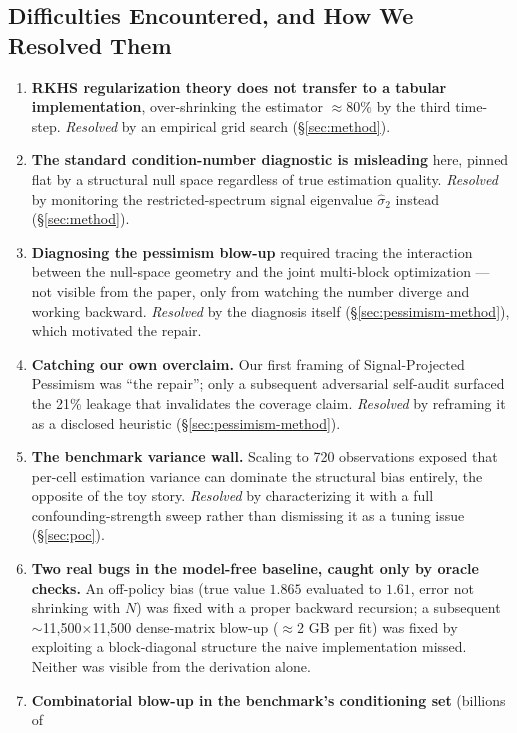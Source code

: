 \documentclass[11pt]{article}
\begin{document}
\subsection{Difficulties Encountered, and How We Resolved Them}
\label{sec:difficulties}

\begin{enumerate}
  \item \textbf{RKHS regularization theory does not transfer to a tabular
  implementation}, over-shrinking the estimator $\approx80\%$ by the third time-step.
  \emph{Resolved} by an empirical grid search (\S\ref{sec:method}).
  \item \textbf{The standard condition-number diagnostic is misleading} here, pinned flat
  by a structural null space regardless of true estimation quality. \emph{Resolved} by
  monitoring the restricted-spectrum signal eigenvalue $\hat\sigma_2$ instead
  (\S\ref{sec:method}).
  \item \textbf{Diagnosing the pessimism blow-up} required tracing the interaction between
  the null-space geometry and the joint multi-block optimization --- not visible from the
  paper, only from watching the number diverge and working backward. \emph{Resolved} by
  the diagnosis itself (\S\ref{sec:pessimism-method}), which motivated the repair.
  \item \textbf{Catching our own overclaim.} Our first framing of Signal-Projected
  Pessimism was ``the repair''; only a subsequent adversarial self-audit surfaced the 21\%
  leakage that invalidates the coverage claim. \emph{Resolved} by reframing it as a
  disclosed heuristic (\S\ref{sec:pessimism-method}).
  \item \textbf{The benchmark variance wall.} Scaling to 720 observations exposed that
  per-cell estimation variance can dominate the structural bias entirely, the opposite of
  the toy story. \emph{Resolved} by characterizing it with a full confounding-strength
  sweep rather than dismissing it as a tuning issue (\S\ref{sec:poc}).
  \item \textbf{Two real bugs in the model-free baseline, caught only by oracle checks.}
  An off-policy bias (true value $1.865$ evaluated to $1.61$, error not shrinking with
  $N$) was fixed with a proper backward recursion; a subsequent $\sim$11,500$\times$11,500
  dense-matrix blow-up ($\approx$2 GB per fit) was fixed by exploiting a block-diagonal
  structure the naive implementation missed. Neither was visible from the derivation alone.
  \item \textbf{Combinatorial blow-up in the benchmark's conditioning set} (billions of

\end{enumerate}
\end{document}
